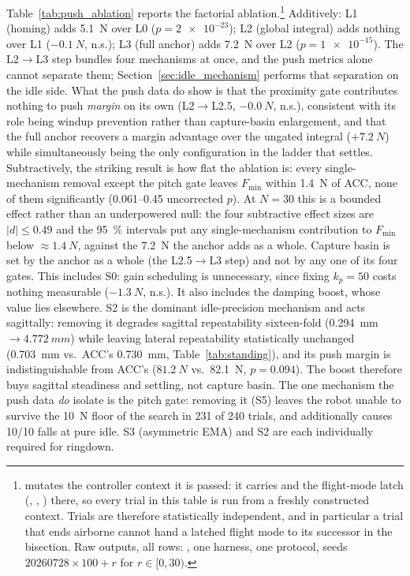 \documentclass[a4paper,fleqn]{cas-dc}
\begin{document}
Table~\ref{tab:push_ablation} reports the factorial ablation.\footnote{ mutates the controller context it is passed: it carries  and the flight-mode latch (, , ) there, so every trial in this table is run from a freshly constructed context. Trials are therefore statistically independent, and in particular a trial that ends airborne cannot hand a latched flight mode to its successor in the bisection. Raw outputs, all rows: , one harness, one protocol, seeds $\num{20260728}{\times}100+r$ for $r\in[0,30)$.}
Additively: L1 (homing) adds \SI{5.1}{N} over L0 ($p{=}\num{2e-23}$); L2 (global integral) adds nothing over L1 ($-\SI{0.1}{N}$, n.s.); L3 (full anchor) adds \SI{7.2}{N} over L2 ($p{=}\num{1e-15}$). The L2$\rightarrow$L3 step bundles four mechanisms at once, and the push metrics alone cannot separate them; Section~\ref{sec:idle_mechanism} performs that separation on the idle side. What the push data do show is that the proximity gate contributes nothing to push \emph{margin} on its own (L2$\rightarrow$L2.5, $-\SI{0.0}{N}$, n.s.), consistent with its role being windup prevention rather than capture-basin enlargement, and that the full anchor recovers a margin advantage over the ungated integral ($+\SI{7.2}{N}$) while simultaneously being the only configuration in the ladder that settles.
Subtractively, the striking result is how flat the ablation is: every single-mechanism removal except the pitch gate leaves $F_{\min}$ within \SI{1.4}{N} of ACC, none of them significantly (\SIrange{0.061}{0.45}{} uncorrected $p$). At $N{=}30$ this is a bounded effect rather than an underpowered null: the four subtractive effect sizes are $|d|{\le}0.49$ and the \SI{95}{\percent} intervals put any single-mechanism contribution to $F_{\min}$ below ${\approx}\SI{1.4}{N}$, against the \SI{7.2}{N} the anchor adds as a whole. Capture basin is set by the anchor as a whole (the L2.5$\rightarrow$L3 step) and not by any one of its four gates. This includes S0: gain scheduling is unnecessary, since fixing $k_p{=}50$ costs nothing measurable ($-\SI{1.3}{N}$, n.s.). It also includes the damping boost, whose value lies elsewhere. S2 is the dominant idle-precision mechanism and acts sagittally: removing it degrades sagittal repeatability sixteen-fold (\SI{0.294}{mm}${\rightarrow}\SI{4.772}{mm}$) while leaving lateral repeatability statistically unchanged (\SI{0.703}{mm} vs.\ ACC's \SI{0.730}{mm}, Table~\ref{tab:standing}), and its push margin is indistinguishable from ACC's ($\SI{81.2}{N}$ vs.\ \SI{82.1}{N}, $p{=}0.094$). The boost therefore buys sagittal steadiness and settling, not capture basin. The one mechanism the push data \emph{do} isolate is the pitch gate: removing it (S5) leaves the robot unable to survive the \SI{10}{N} floor of the search in \num{231} of \num{240} trials, and additionally causes \num{10}/\num{10} falls at pure idle. S3 (asymmetric EMA) and S2 are each individually required for ringdown.
\end{document}
